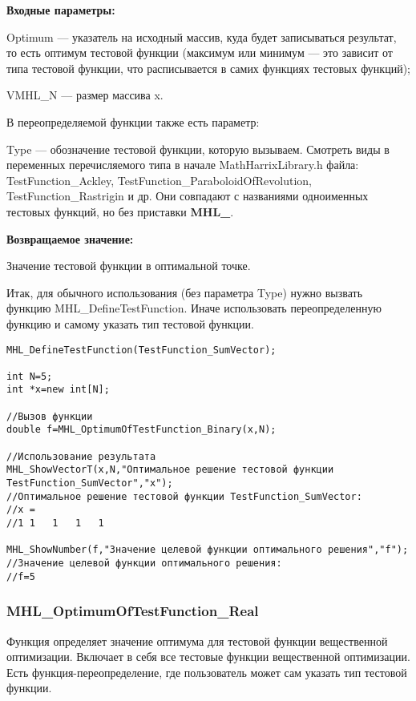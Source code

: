 \documentclass[a4paper,12pt]{article}
\begin{document}
\textbf{Входные параметры:}

Optimum --- указатель на исходный массив, куда будет записываться результат, то есть оптимум тестовой функции (максимум или минимум --- это зависит от типа тестовой функции, что расписывается в самих функциях тестовых функций);

     VMHL\_N --- размер массива x.

В переопределяемой функции также есть параметр:
  
Type --- обозначение тестовой функции, которую вызываем.
Смотреть виды в переменных перечисляемого типа в начале MathHarrixLibrary.h файла: TestFunction\_Ackley, TestFunction\_ParaboloidOfRevolution, TestFunction\_Rastrigin и др. Они совпадают с названиями одноименных тестовых функций, но без приставки \textbf{MHL\_}.

\textbf{Возвращаемое значение:}
 
Значение тестовой функции в оптимальной точке.

Итак, для обычного использования (без параметра Type) нужно вызвать функцию MHL\_DefineTestFunction. Иначе использовать переопределенную функцию и самому указать тип тестовой функции.


\begin{lstlisting}[label=code_use_MHL_OptimumOfTestFunction_Binary,caption=Пример использования]
MHL_DefineTestFunction(TestFunction_SumVector);

int N=5;
int *x=new int[N];

//Вызов функции
double f=MHL_OptimumOfTestFunction_Binary(x,N);

//Использование результата
MHL_ShowVectorT(x,N,"Оптимальное решение тестовой функции TestFunction_SumVector","x");
//Оптимальное решение тестовой функции TestFunction_SumVector:
//x =	
//1	1	1	1	1

MHL_ShowNumber(f,"Значение целевой функции оптимального решения","f");
//Значение целевой функции оптимального решения:
//f=5
\end{lstlisting}

\subsubsection{MHL\_OptimumOfTestFunction\_Real}\label{MHL_OptimumOfTestFunction_Real}

Функция определяет значение оптимума для тестовой функции вещественной оптимизации. Включает в себя все тестовые функции вещественной оптимизации. Есть функция-переопределение, где пользователь может сам указать тип тестовой функции.
\end{document}
